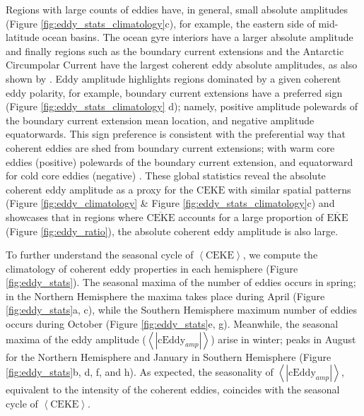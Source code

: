 \documentclass[draft,linenumbers]{agujournal2019}
\newcommand{\MEKE}{\overline{\textrm{EKE}}}
\newcommand{\MCEKE}{\overline{\textrm{CEKE}}}
\newcommand{\CEKE}{\textrm{CEKE}}
\newcommand{\cEddy}{\textrm{cEddy}}
\begin{document}
	Regions with large counts of eddies have, in general, small absolute amplitudes (Figure \ref{fig:eddy_stats_climatology}c), for example, the eastern side of mid-latitude ocean basins.
	The ocean gyre interiors have a larger absolute amplitude and finally regions such as the boundary current extensions and the Antarctic Circumpolar Current have the largest coherent eddy absolute amplitudes, as also shown by \citet{Chelton_The_2011}.
	Eddy amplitude highlights regions dominated by a given coherent eddy polarity, for example, boundary current extensions have a preferred sign (Figure \ref{fig:eddy_stats_climatology} d); namely, positive amplitude polewards of the boundary current extension mean location, and negative amplitude equatorwards. 
	This sign preference is consistent with the preferential way that coherent eddies are shed from boundary current extensions; with warm core eddies (positive)  polewards of the boundary current extension, and equatorward for cold core eddies (negative) \citep{Chelton_Global_2007,Chelton_The_2011,Kang_eddy_characteristics_2013}. 
	These global statistics reveal the absolute coherent eddy amplitude as a proxy for the $\CEKE$ with similar spatial patterns (Figure \ref{fig:eddy_climatology} \& Figure \ref{fig:eddy_stats_climatology}c) and showcases that in regions where $\MCEKE$ accounts for a large proportion of $\MEKE$ (Figure \ref{fig:eddy_ratio}), the absolute coherent eddy amplitude is also large.

	To further understand the seasonal cycle of $\left<\CEKE\right>$, we compute the climatology of coherent eddy properties in each hemisphere (Figure \ref{fig:eddy_stats}). 
	The seasonal maxima of the number of eddies occurs in spring; in the Northern Hemisphere the maxima takes place during April (Figure \ref{fig:eddy_stats}a, c), while the Southern Hemisphere maximum number of eddies occurs during October (Figure \ref{fig:eddy_stats}e, g). 
	Meanwhile, the seasonal maxima of the eddy amplitude ($\left<|\cEddy_{amp}|\right>$) arise in winter; peaks in August for the Northern Hemisphere and January in Southern Hemisphere (Figure \ref{fig:eddy_stats}b, d, f, and h). 
	As expected, the seasonality of $\left<|\cEddy_{amp}|\right>$, equivalent to the intensity of the coherent eddies, coincides with the seasonal cycle of $\left<\CEKE\right>$.
\end{document}
